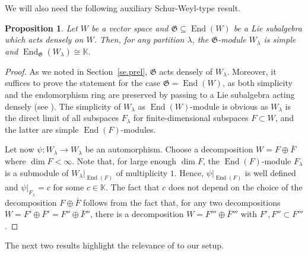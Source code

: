 \documentclass[11pt]{article}
\theoremstyle{plain}
\newtheorem{proposition}[lemma]{Proposition}
\theoremstyle{nonumberplain}
\theoremstyle{plain}
\theoremstyle{nonumberplain}
\newtheorem{proof}{Proof}
\newcommand\bK{\mathbb K}
\newcommand\fG{\mathfrak{G}}
\DeclareMathOperator{\End}{\mathrm{End}}
\begin{document}
We will also need the following auxiliary Schur-Weyl-type result. 


\begin{proposition}\label{le.sw}
  Let $W$ be a vector space and $\fG\subseteq \End(W)$ {be} a Lie
  subalgebra { which acts} densely on $W$. Then, for any partition
  $\lambda$, the $\fG$-module $W_\lambda$ is simple and
  $\End_\fG(W_\lambda)\cong \bK$.
\end{proposition}
\begin{proof}  As we noted in Section~\ref{se.prel}, $\mathfrak{G}$ acts densely of $W_\lambda$.  Moreover, it suffices to prove the statement for the case $\mathfrak{G}=\End(W)$, as both simplicity and the endomorphism ring are
  preserved by passing to a Lie subalgebra acting densely (see
  \cite[Lemma 7.3, Theorem 7.4]{PS2}).
The simplicity of $W_\lambda$ as $\End(W)$-module is obvious as $W_\lambda$ is the direct limit of all subspaces $F_\lambda$ for finite-dimensional subspaces $F\subset W$, and the latter are simple $\End(F)$-modules.

Let now $\psi:W_\lambda\to W_\lambda$ be an automorphism.  Choose a
decomposition $W=F\oplus \bar{F}$ where $\dim F<\infty$.  Note that,
for large enough $\dim F$, the $\End(F)$-module $F_\lambda$ is a
submodule of $W_\lambda\Big|_{\End(F)}$ of multiplicity $1$.  Hence,
$\psi\big|_{\End(F)}$ is well defined and $\psi\big|_{F_\lambda}=c$
for some $c\in \bK$.  The fact that $c$ does not depend on the choice
of the decomposition $F\oplus \bar{F}$ follows from the fact that, for
any two decompositions $W=F'\oplus \bar{F}'=F''\oplus \bar{F}''$,
there is a decomposition $W=F'''\oplus \bar{F}'''$ with
$F',F''\subset F'''$.
\end{proof}




The next two results highlight the relevance of  to our setup.
\end{document}
